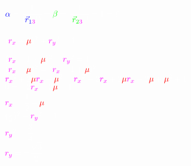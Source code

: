 \documentclass{article}
\newcommand{\cw}{\color{white}}
\newcommand{\cm}{\color{mag}}
\newcommand{\cred}{\color{red}}
\newcommand{\cb}{\color{blue}}
\newcommand{\cg}{\color{green}}
\begin{document}
$
\cb\alpha\cw=\cfrac{1}{|\cb\vec{r}_{1\cm3}\cw|^3}\cw=
\cg\beta\cw=\cfrac{1}{|\cg\vec{r}_{2\cm3}\cw|^3}=1=\ell
$\\\\


$\cw
(\cm r_x\cw+\cred\mu\cw)^2+\cm r_y\cw^2\cw=1
$

$\cw
(\cm r_x\cw-1+\cred\mu\cw)^2+\cm r_y\cw^2\cw=1
$\\

$\cw
(\cm r_x\cw+\cred\mu\cw)^2\cw=
(\cm r_x\cw-1+\cred\mu\cw)^2\cw
$\\

$\cw
\cm r_x\cw^2+2\cred\mu\cm r_x\cw+\cred\mu\cw^2=
\cm r_x\cw^2-2\cm r_x\cw+2\cred\mu\cm r_x\cw-2\cred\mu\cw+
\cred\mu\cw^2+1
$\\

$\cw
0=-2\cm r_x\cw-2\cred\mu\cw+1
$\\

$
\cm r_x\cw=\cfrac{1}{2}-\cred\mu\cw
$\\

$\cw
(\frac{1}{2})^2+\cm r_y\cw^2=1
$\\

$
\cm r_y\cw^2=\cfrac{3}{4}
$\\

$
\cm r_y\cw=\pm\cfrac{\sqrt{3}}{2}
$
\end{document}
